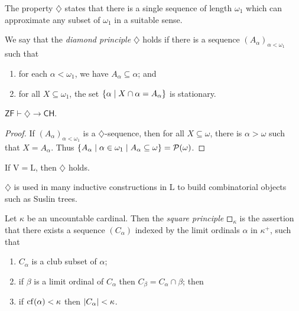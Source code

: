 The property \( \diamondsuit \) states that there is a single sequence of length \( \omega_1 \) which can approximate any subset of \( \omega_1 \) in a suitable sense.
\begin{definition}
    We say that the \emph{diamond principle} \( \diamondsuit \) holds if there is a sequence \( (A_\alpha)_{\alpha < \omega_1} \) such that
    \begin{enumerate}
        \item for each \( \alpha < \omega_1 \), we have \( A_\alpha \subseteq \alpha \); and
        \item for all \( X \subseteq \omega_1 \), the set \( \qty{\alpha \mid X \cap \alpha = A_\alpha} \) is stationary.
    \end{enumerate}
\end{definition}
\begin{lemma}
    \( \mathsf{ZF} \vdash \diamondsuit \to \mathsf{CH} \).
\end{lemma}
\begin{proof}
    If \( (A_\alpha)_{\alpha < \omega_1} \) is a \( \diamondsuit \)-sequence, then for all \( X \subseteq \omega \), there is \( \alpha > \omega \) such that \( X = A_\alpha \).
    Thus \( \qty{A_\alpha \mid \alpha \in \omega_1 \mid A_\alpha \subseteq \omega} = \mathcal P(\omega) \).
\end{proof}
\begin{theorem}
    If \( \mathrm{V} = \mathrm{L} \), then \( \diamondsuit \) holds.
\end{theorem}
\begin{remark}
    \( \diamondsuit \) is used in many inductive constructions in \( \mathrm{L} \) to build combinatorial objects such as Suslin trees.
\end{remark}
\begin{definition}
    Let \( \kappa \) be an uncountable cardinal.
    Then the \emph{square principle} \( \mdwhtsquare_\kappa \) is the assertion that there exists a sequence \( (C_\alpha) \) indexed by the limit ordinals \( \alpha \) in \( \kappa^+ \), such that
    \begin{enumerate}
        \item \( C_\alpha \) is a club subset of \( \alpha \);
        \item if \( \beta \) is a limit ordinal of \( C_\alpha \) then \( C_\beta = C_\alpha \cap \beta \); then
        \item if \( \operatorname{cf}(\alpha) < \kappa \) then \( \abs{C_\alpha} < \kappa \).
    \end{enumerate}
\end{definition}
